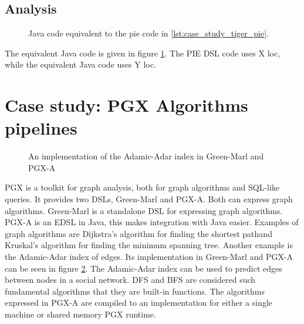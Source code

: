 
\subsection{Analysis}
\label{sec:evaluation__tiger__analysis}

\begin{figure}
  \caption{Java code equivalent to the pie code in \ref{lst:case_study_tiger_pie}.}
  \label{lst:case_study_tiger_java}
\end{figure}

The equivalent Java code is given in figure \ref{lst:case_study_tiger_java}.
The \ac{PIE} \ac{DSL} code uses X \ac{loc}, while the equivalent Java code uses Y \ac{loc}.

\section{Case study: PGX Algorithms pipelines}
\label{sec:evaluation__database}

\begin{figure}
  \caption{An implementation of the Adamic-Adar index in Green-Marl and \ac{PGX-A}}
  \label{lst:case_study_pgx_a_adamic_adar}
  
  
\end{figure}

\Ac{PGX} is a toolkit for graph analysis, both for graph algorithms and SQL-like queries.
It provides two \acp{DSL}, Green-Marl and \ac{PGX-A}.
Both can express graph algorithms.
Green-Marl is a standalone \ac{DSL} for expressing graph algorithms.
\Ac{PGX-A} is an \ac{EDSL} in Java, this makes integration with Java easier.
Examples of graph algorithms are Dijkstra's algorithm for finding the shortest path\missingref and Kruskal's algorithm for finding the minimum spanning tree\missingref.
Another example is the Adamic-Adar index of edges.
Its implementation in Green-Marl and \ac{PGX-A} can be seen in figure \ref{lst:case_study_pgx_a_adamic_adar}.
The Adamic-Adar index can be used to predict edges between nodes in a social network.
\Ac{DFS} and \ac{BFS} are considered such fundamental algorithms that they are built-in functions.
The algorithms expressed in \ac{PGX-A} are compiled to an implementation for either a single machine or shared memory \ac{PGX} runtime.



